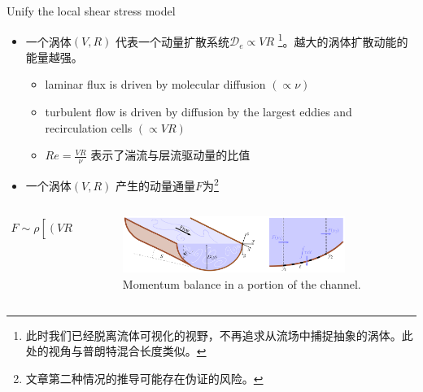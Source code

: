 \documentclass[10pt,xcolor={table,dvipsnames},t]{beamer}
\begin{document}
\begin{frame}{Unify the local shear stress model}
    \begin{itemize}
        \item 一个涡体$\left( V, R \right) $ 代表一个动量扩散系统$\mathcal{D}_e \propto VR$ \cite{ocfjfm2024}\footnote{此时我们已经脱离流体可视化的视野，不再追求从流场中捕捉抽象的涡体。此处的视角与普朗特混合长度类似。}。越大的涡体扩散动能的能量越强。
            \begin{itemize}
                \item laminar flux is driven by molecular diffusion $\left( \propto \nu \right) $
                \item turbulent flow is driven by diffusion by the largest eddies and recirculation cells $\left( \propto VR \right) $
                \item $Re = \frac{VR}{\nu}$ 表示了湍流与层流驱动量的比值
            \end{itemize}
        \item 一个涡体$\left( V, R \right) $ 产生的动量通量$F$为\footnote{文章第二种情况的推导可能存在伪证的风险。} \cite{ocfjfm2024}
    \end{itemize}
    \begin{columns}
        \begin{column}{0.5\textwidth}
            \begin{align*}
                F \sim \rho \left[ (VR)^2 \right] '\sim -\rho \int_0^{R}  \mathcal{D}_e \frac{\partial u}{\partial y} dz
            .\end{align*}
        \end{column}
        \begin{column}{0.5\textwidth}
            \begin{figure}[htpb]
                \centering
                \includegraphics[width=0.85\textwidth]{./figures/momentum-flux.png}
                \caption{Momentum balance in a portion of the channel. \cite{ocfjfm2024}}
                \label{fig:-figures-momentum-flux-png}
            \end{figure}
        \end{column}
    \end{columns}
\end{frame}
\end{document}
